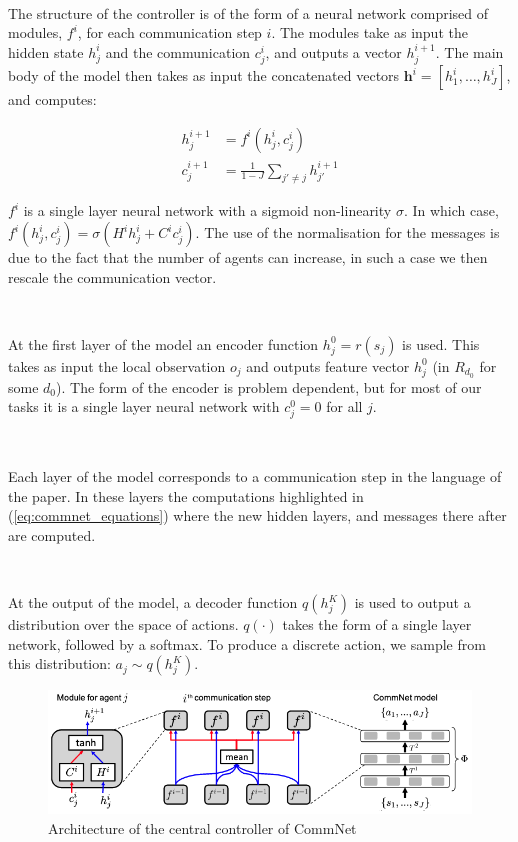 \documentclass{article}
\begin{document}
\

The structure of the controller is of the form of a neural network comprised of modules, $f^i$, for each communication step $i$. The modules take as input the hidden state $h^i_j$ and the communication $c^i_j$,  and outputs a vector $h^{i+1}_j$. The main body of the model then takes as input the concatenated vectors $\mathbf{h}^i = [h^i_1, \hdots,  h^i_J]$, and computes:


\begin{equation}\label{eq:commnet_equations}
\begin{aligned}
	h_j^{i+1} &= f^i(h^i_j, c^i_j) \\
	c_j^{i+1} &= \frac{1}{1 - J} \sum_{j' \neq j} h_{j'}^{i + 1}
\end{aligned}
\end{equation}

$f^i$ is a single layer neural network with a sigmoid non-linearity $\sigma$. In which case, $f^i(h^i_j, c^i_j) = \sigma(H^i h^i_j +  C^i c^i_j)$. The use of the normalisation for the messages is due to the fact that the number of agents can increase, in such a case we then rescale the communication vector.

\

At the first layer of the model an encoder function $h_j^0 = r(s_j)$ is used. This takes as input the local observation $o_j$ and outputs feature vector $h_j^0$ (in $R_{d_0}$ for some $d_0$). The form of the encoder is problem dependent,  but for most of our tasks it is a single layer neural network with $c_j^0 = 0$ for all $j$.  

\

Each layer of the model corresponds to a communication step in the language of the paper. In these layers the computations highlighted in (\ref{eq:commnet_equations}) where the new hidden layers, and messages there after are computed.

\

At the output of the model, a decoder function $q(h_j^K)$ is used to output a distribution over the space of  actions. $q(\cdot)$ takes the form of a single layer network, followed by a softmax. To produce a discrete  action, we sample from this distribution: $a_j \sim q(h_j^K )$.  

\begin{figure}
	\centering
	\includegraphics[scale=0.5]{images/commnet.png}
	\caption{Architecture of the central controller of CommNet \citep{sukhbaatar2016commnet}}
	\label{fig:commnet}
\end{figure}
\end{document}
